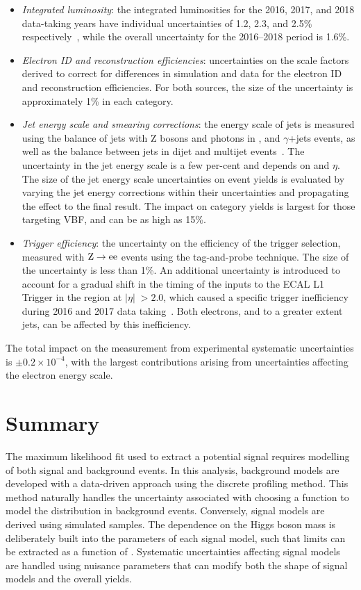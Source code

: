 \begin{itemize}
\item \textit{Integrated luminosity}:
  the integrated luminosities for the 2016, 2017, and 2018 data-taking years have individual uncertainties of 1.2, 2.3, and 2.5\% respectively~\cite{CMSlumi2016,CMSlumi2017,CMSlumi2018}, while the overall uncertainty for the 2016--2018 period is 1.6\%. 
\item \textit{Electron ID and reconstruction efficiencies}:
  uncertainties on the scale factors derived to correct for differences in simulation and data for the electron ID and reconstruction efficiencies. For both sources, the size of the uncertainty is approximately 1\% in each category.
\item \textit{Jet energy scale and smearing corrections}:
  the energy scale of jets is measured using the \pt balance of jets with $\mathrm{Z}$ bosons and photons in \Zee, \Zmumu and $\gamma$+jets events, as well as the \pt balance between jets in dijet and multijet events~\cite{JetsInRun2}.
  The uncertainty in the jet energy scale is a few per-cent and depends on \pt and $\eta$.
  The size of the jet energy scale uncertainties on event yields is evaluated by varying the jet energy corrections within their uncertainties and propagating the effect to the final result. The impact on category yields is largest for those targeting VBF, and can be as high as 15\%.
\item \textit{Trigger efficiency}:
  the uncertainty on the efficiency of the trigger selection, measured with $\mathrm{Z}\rightarrow{\mathrm{e}\mathrm{e}}$ events using the tag-and-probe technique. The size of the uncertainty is less than 1\%. An additional uncertainty is introduced to account for a gradual shift in the timing of the inputs to the ECAL L1 Trigger in the region at $|\eta|\; > 2.0$, which caused a specific trigger inefficiency during 2016 and 2017 data taking~\cite{CMS_L1T}. Both electrons, and to a greater extent jets, can be affected by this inefficiency.
\end{itemize} 

\noindent The total impact on the \BHee measurement from experimental systematic uncertainties is $\pm{0.2\times10^{-4}}$, with the largest contributions arising from uncertainties affecting the electron energy scale.

\section{Summary}
The maximum likelihood fit used to extract a potential \Hee signal requires modelling of both signal and background events. In this analysis, background models are developed with a data-driven approach using the discrete profiling method. This method naturally handles the uncertainty associated with choosing a function to model the \mee distribution in background events. Conversely, signal models are derived using simulated samples. The dependence on the Higgs boson mass is deliberately built into the parameters of each signal model, such that limits can be extracted as a function of \mH. Systematic uncertainties affecting signal models are handled using nuisance parameters that can modify both the shape of signal models and the overall yields. 
